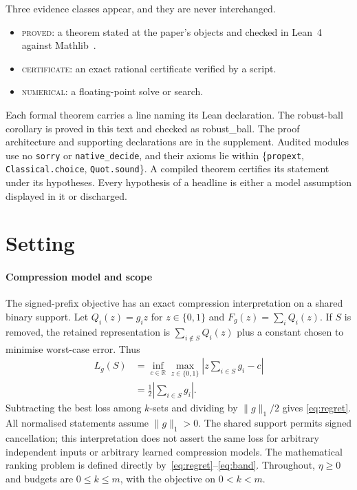 \documentclass[conference]{IEEEtran}
\theoremstyle{definition}
\newcommand{\lean}[1]{\textsf{\footnotesize #1}}
\newcommand{\PROVED}{\textsc{proved}}
\newcommand{\CERT}{\textsc{certificate}}
\newcommand{\NUM}{\textsc{numerical}}
\begin{document}
Three evidence classes appear, and they are never interchanged.
\begin{itemize}
\item \PROVED: a theorem stated at the paper's objects and checked in
Lean~4~\cite{demoura2021} against Mathlib~\cite{mathlib2020}.
\item \CERT: an exact rational certificate verified by a script.
\item \NUM: a floating-point solve or search.
\end{itemize}
Each formal theorem carries a line naming its Lean declaration. The robust-ball corollary
is proved in this text and checked as \lean{robust\_ball}. The proof architecture and supporting
declarations are in the supplement. Audited modules use no \texttt{sorry} or
\texttt{native\_decide}, and their axioms lie within \{\texttt{propext},
\texttt{Classical.choice}, \texttt{Quot.sound}\}. A compiled theorem certifies its statement
under its hypotheses. Every hypothesis of a headline is either a model assumption displayed
in it or discharged.

\section{Setting}
\label{sec:setting}

\paragraph{Compression model and scope}
The signed-prefix objective has an exact compression interpretation on a shared binary
support. Let $Q_i(z)=g_i z$ for $z\in\{0,1\}$ and $F_g(z)=\sum_iQ_i(z)$.
If $S$ is removed, the retained representation is $\sum_{i\notin S}Q_i(z)$ plus a constant
chosen to minimise worst-case error. Thus
\begin{equation}
\begin{aligned}
L_g(S)&=\inf_{c\in\mathbb R}\max_{z\in\{0,1\}}
\left|z\sum_{i\in S}g_i-c\right|\\
&=\frac12\left|\sum_{i\in S}g_i\right|.
\end{aligned}
\label{eq:physicalmodel}
\end{equation}
Subtracting the best loss among $k$-sets and dividing by $\|g\|_1/2$ gives
\eqref{eq:regret}. All normalised statements assume $\|g\|_1>0$.
The shared support permits signed cancellation; this interpretation does not assert the
same loss for arbitrary independent inputs or arbitrary learned compression models.
The mathematical ranking problem is defined directly by~\eqref{eq:regret}--\eqref{eq:band}.
Throughout, $\eta\ge0$ and budgets are $0\le k\le m$, with the objective on $0<k<m$.
\end{document}
